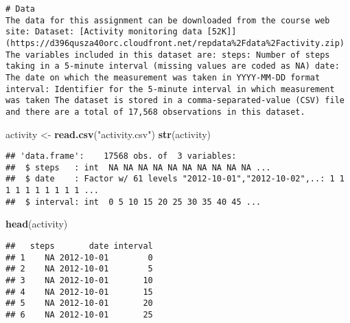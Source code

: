 \documentclass[]{article}
\newenvironment{Shaded}{\begin{snugshade}}{\end{snugshade}}
\newcommand{\KeywordTok}[1]{\textcolor[rgb]{0.13,0.29,0.53}{\textbf{#1}}}
\newcommand{\StringTok}[1]{\textcolor[rgb]{0.31,0.60,0.02}{#1}}
\newcommand{\OperatorTok}[1]{\textcolor[rgb]{0.81,0.36,0.00}{\textbf{#1}}}
\newcommand{\NormalTok}[1]{#1}
\begin{document}
\begin{verbatim}
# Data
The data for this assignment can be downloaded from the course web site: Dataset: [Activity monitoring data [52K]](https://d396qusza40orc.cloudfront.net/repdata%2Fdata%2Factivity.zip) The variables included in this dataset are: steps: Number of steps taking in a 5-minute interval (missing values are coded as NA) date: The date on which the measurement was taken in YYYY-MM-DD format interval: Identifier for the 5-minute interval in which measurement was taken The dataset is stored in a comma-separated-value (CSV) file and there are a total of 17,568 observations in this dataset.
\end{verbatim}

\begin{Shaded}
\begin{Highlighting}[]
\NormalTok{activity <-}\StringTok{ }\KeywordTok{read.csv}\NormalTok{(}\StringTok{"activity.csv"}\NormalTok{)}
\KeywordTok{str}\NormalTok{(activity)}
\end{Highlighting}
\end{Shaded}

\begin{verbatim}
## 'data.frame':    17568 obs. of  3 variables:
##  $ steps   : int  NA NA NA NA NA NA NA NA NA NA ...
##  $ date    : Factor w/ 61 levels "2012-10-01","2012-10-02",..: 1 1 1 1 1 1 1 1 1 1 ...
##  $ interval: int  0 5 10 15 20 25 30 35 40 45 ...
\end{verbatim}

\begin{Shaded}
\begin{Highlighting}[]
\KeywordTok{head}\NormalTok{(activity)}
\end{Highlighting}
\end{Shaded}

\begin{verbatim}
##   steps       date interval
## 1    NA 2012-10-01        0
## 2    NA 2012-10-01        5
## 3    NA 2012-10-01       10
## 4    NA 2012-10-01       15
## 5    NA 2012-10-01       20
## 6    NA 2012-10-01       25
\end{verbatim}

\begin{Shaded}
\end{Shaded}
\end{document}
